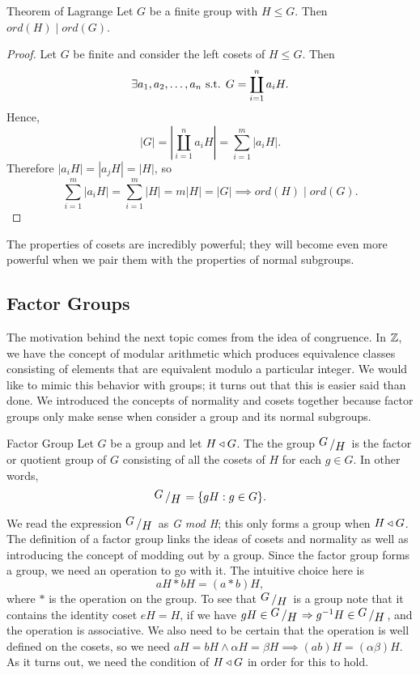\begin{theorem}{Theorem of Lagrange}
	Let $G$ be a finite group with $H\leq G$. Then $ord(H)\mid ord(G)$.
\end{theorem}
\begin{proof}
	Let $G$ be finite and consider the left cosets of $H\leq G$. Then
	\[
		\exists a_{1},a_{2},\dots,a_{n}\text{ s.t. } G=\coprod_{i=1}^{n}a_{i}H.
	\]
	Hence,
	\[
		|G| = \left|\coprod_{i=1}^{n}a_{i}H\right| = \sum_{i=1}^{m}|a_{i}H|.
	\]
	Therefore $|a_{i}H|=|a_{j}H|=|H|$, so
	\[
		\sum_{i=1}^{m}|a_{i}H| = \sum_{i=1}^{m}|H| = m|H| = |G|\implies ord(H)\mid ord(G).
	\]
\end{proof}
The properties of cosets are incredibly powerful; they will become even more powerful when we pair them with the properties of normal subgroups.

\subsection*{Factor Groups}
The motivation behind the next topic comes from the idea of congruence. In $\mathbb{Z}$, we have the concept of modular arithmetic which produces equivalence classes consisting of elements that are equivalent modulo a particular integer.
We would like to mimic this behavior with groups; it turns out that this is easier said than done.
We introduced the concepts of normality and cosets together because factor groups only make sense when consider a group and its normal subgroups.

\begin{definition}{Factor Group}
	Let $G$ be a group and let $H\triangleleft G$. The the group $\fgroup{G}{H}$ is the factor or quotient group of $G$ consisting of all the cosets of $H$ for each $g\in G$. In other words,
	\[
		\fgroup{G}{H}=\{gH:g\in G\}.
	\]
\end{definition}
We read the expression $\fgroup{G}{H}$ as \textit{G mod H}; this only forms a group when $H\triangleleft G$.
The definition of a factor group links the ideas of cosets and normality as well as introducing the concept of modding out by a group.
Since the factor group forms a group, we need an operation to go with it.
The intuitive choice here is
\[
	aH * bH = (a*b)H,
\]
where $*$ is the operation on the group.
To see that $\fgroup{G}{H}$ is a group note that it contains the identity coset $eH=H$, if we have $gH\in\fgroup{G}{H} \implies g^{-1}H\in\fgroup{G}{H}$, and the operation is associative.
We also need to be certain that the operation is well defined on the cosets, so we need $aH=bH\land \alpha H=\beta H\implies (ab)H=(\alpha\beta)H$.
As it turns out, we need the condition of $H\triangleleft G$ in order for this to hold.

